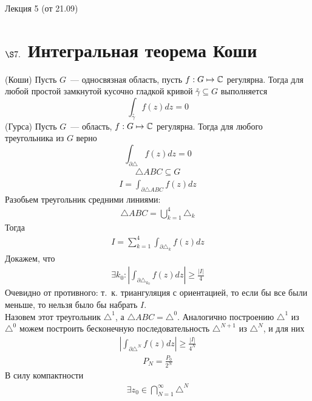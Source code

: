 \LARGE{Лекция 5 (от 21.09)}
\normalsize
\section{$\S 7.$ Интегральная теорема Коши}
\theorem (Коши)
Пусть $G$~--- односвязная область, пусть $f: G \mapsto \mathbb{C}$
регулярна. Тогда для любой простой замкнутой кусочно гладкой кривой
$\overset{\circ}{\gamma} \subseteq G$ выполняется
\begin{equation} \label{(7.1)}
  \int_{\overset{\circ}{\gamma}}f(z)dz = 0
\end{equation}
\lemma (Гурса)
Пусть $G$~--- область, $f: G \mapsto \mathbb{C}$ регулярна. Тогда для
любого треугольника из $G$ верно
\begin{equation} \label{(7.2)}
  \int_{\partial \triangle} f(z) dz = 0
\end{equation}
\pr
\begin{align*}
  \triangle ABC \subseteq G
\end{align*}
\begin{align*}
  I = \int_{\partial \triangle ABC}f(z)dz
\end{align*}
Разобьем треугольник средними линиями:
\begin{align*}
  \triangle ABC = \bigcup_{k=1}^{4}\triangle_k
\end{align*}
Тогда
\begin{align*}
  I = \sum_{k=1}^4\int_{\partial \triangle_k}f(z)dz
\end{align*}
Докажем, что
\begin{align*}
  \exists k_0: \left| \int_{\partial \triangle_{k_0}} f(z)dz\right|\geq\frac{\left| I \right|}{4}
\end{align*}
Очевидно от противного: т.~к. триангуляция с ориентацией, то если бы все были
меньше, то нельзя было бы набрать $I$.
\\
Назовем этот треугольник $\triangle^1$, а $\triangle ABC = \triangle^0$.
Аналогично построению $\triangle^1$ из $\triangle^0$ можем построить
бесконечную последовательность $\triangle^{N+1}$ из $\triangle^N$, и для них
\begin{align*}
  \left| \int_{\partial \triangle^N} f(z)dz\right|\geq\frac{\left| I \right|}{4^N}
\end{align*}
\begin{align*}
  P_N = \frac{P_0}{2^N}
\end{align*}
В силу компактности
\begin{align*}
  \exists z_0 \in \bigcap_{N=1}^{\infty}\triangle^N
\end{align*}
